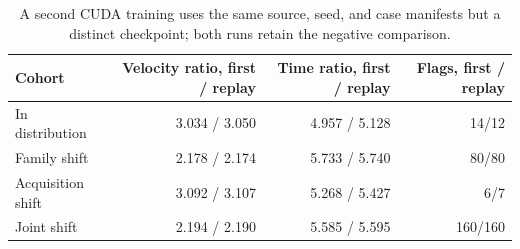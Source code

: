 \begin{table}[htbp]
\centering
\small
\caption{A second CUDA training uses the same source, seed, and case manifests but a distinct checkpoint; both runs retain the negative comparison.}
\label{tab:replay-sensitivity}
\begin{tabular}{lrrr}
\toprule
Cohort & Velocity ratio, first / replay & Time ratio, first / replay & Flags, first / replay \\
\midrule
In distribution & 3.034 / 3.050 & 4.957 / 5.128 & 14/12 \\
Family shift & 2.178 / 2.174 & 5.733 / 5.740 & 80/80 \\
Acquisition shift & 3.092 / 3.107 & 5.268 / 5.427 & 6/7 \\
Joint shift & 2.194 / 2.190 & 5.585 / 5.595 & 160/160 \\
\bottomrule
\end{tabular}
\end{table}

